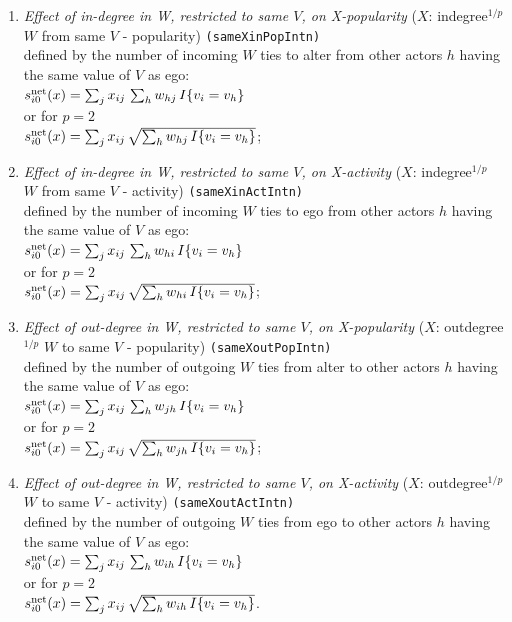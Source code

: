 \documentclass[a4paper,fleqn,11pt]{article}
\newcommand{\+}{\, + \,}
\newcommand{\vit}{\theenumi}
\newcounter{savenumi}
\begin{document}
\begin{enumerate}
\setcounter{enumi}{\value{savenumi}}
 \item {\em Effect of in-degree in W, restricted to same $V$, on X-popularity }
 ($X$: indegree$^{1/p}$ $W$ from same $V$ - popularity)   \texttt{(sameXinPopIntn)}\\
 defined by the number of incoming $W$ ties to alter from other actors $h$
 having the same value of $V$ as ego:\\
 $s^{\rm net}_{i\vit}(x) =  \sum_j x_{ij}\, \sum_h w_{hj}\,I\{v_i = v_h\}  $ \\
 or for $p=2$ \\
   $s^{\rm net}_{i\vit}(x) =  \sum_j x_{ij}\, \sqrt{\sum_h w_{hj}\,I\{v_i = v_h\}}   $;

 \item {\em Effect of in-degree in W, restricted to same $V$, on X-activity }
 ($X$: indegree$^{1/p}$ $W$ from same $V$ - activity) \texttt{(sameXinActIntn)}\\
 defined by the number of incoming $W$ ties to ego from other actors $h$
 having the same value of $V$ as ego:\\
 $s^{\rm net}_{i\vit}(x) =  \sum_j x_{ij}\, \sum_h w_{hi}\,I\{v_i = v_h\}  $ \\
 or for $p=2$ \\
   $s^{\rm net}_{i\vit}(x) =  \sum_j x_{ij}\, \sqrt{\sum_h w_{hi}\,I\{v_i = v_h\}}   $;

 \item {\em Effect of out-degree in W, restricted to same $V$, on X-popularity }
 ($X$: outdegree$^{1/p}$ $W$ to same $V$ - popularity)   \texttt{(sameXoutPopIntn)}\\
 defined by the number of outgoing $W$ ties from alter to other actors $h$
 having the same value of $V$ as ego:\\
 $s^{\rm net}_{i\vit}(x) =  \sum_j x_{ij}\, \sum_h w_{jh}\,I\{v_i = v_h\}  $ \\
 or for $p=2$ \\
   $s^{\rm net}_{i\vit}(x) =  \sum_j x_{ij}\, \sqrt{\sum_h w_{jh}\,I\{v_i = v_h\}}   $;

 \item {\em Effect of out-degree in W, restricted to same $V$, on X-activity }
 ($X$: outdegree$^{1/p}$ $W$ to same $V$ - activity) \texttt{(sameXoutActIntn)}\\
 defined by the number of outgoing $W$ ties from ego to other actors $h$
 having the same value of $V$ as ego:\\
 $s^{\rm net}_{i\vit}(x) =  \sum_j x_{ij}\, \sum_h w_{ih}\,I\{v_i = v_h\}  $ \\
 or for $p=2$ \\
   $s^{\rm net}_{i\vit}(x) =  \sum_j x_{ij}\, \sqrt{\sum_h w_{ih}\,I\{v_i = v_h\}}   $.
\setcounter{savenumi}{\value{enumi}}
\end{enumerate}
\end{document}
